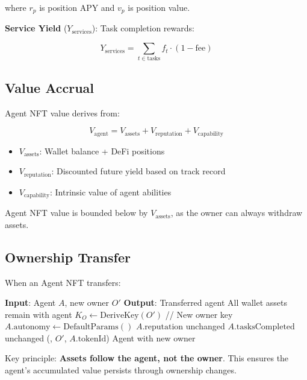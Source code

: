 where $r_p$ is position APY and $v_p$ is position value.

\textbf{Service Yield} ($Y_{\text{services}}$): Task completion rewards:

\begin{equation}
Y_{\text{services}} = \sum_{t \in \text{tasks}} f_t \cdot (1 - \text{fee})
\end{equation}

\subsection{Value Accrual}

Agent NFT value derives from:

\begin{equation}
V_{\text{agent}} = V_{\text{assets}} + V_{\text{reputation}} + V_{\text{capability}}
\end{equation}

\begin{itemize}
    \item $V_{\text{assets}}$: Wallet balance + DeFi positions
    \item $V_{\text{reputation}}$: Discounted future yield based on track record
    \item $V_{\text{capability}}$: Intrinsic value of agent abilities
\end{itemize}

\begin{theorem}
Agent NFT value is bounded below by $V_{\text{assets}}$, as the owner can always withdraw assets.
\end{theorem}

\subsection{Ownership Transfer}

When an Agent NFT transfers:

\begin{algorithm}[t]
\caption{Agent NFT Transfer}
\label{alg:transfer}
\begin{algorithmic}[1]
\STATE \textbf{Input}: Agent $A$, new owner $O'$
\STATE \textbf{Output}: Transferred agent
\STATE {}
\STATE All wallet assets remain with agent
\STATE $K_O \leftarrow \text{DeriveKey}(O')$ // New owner key
\STATE {}
\STATE $A.\text{autonomy} \leftarrow \text{DefaultParams}()$
\STATE {}
\STATE $A.\text{reputation}$ unchanged
\STATE $A.\text{tasksCompleted}$ unchanged
\STATE {}
\STATE {}(, $O'$, $A.\text{tokenId}$)
\RETURN Agent with new owner
\end{algorithmic}
\end{algorithm}

Key principle: \textbf{Assets follow the agent, not the owner}. This ensures the agent's accumulated value persists through ownership changes.

